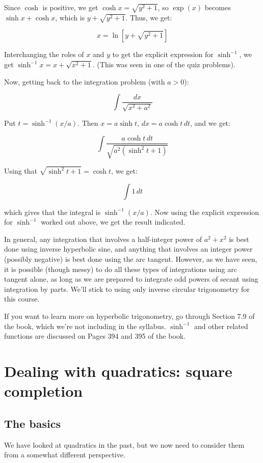 \documentclass[10pt]{amsart}
\begin{document}
Since $\cosh$ is positive, we get $\cosh x = \sqrt{y^2 + 1}$, so
$\exp(x)$ becomes $\sinh x + \cosh x$, which is $y + \sqrt{y^2 + 1}$. Thus, we get:

$$x = \ln[y + \sqrt{y^2 + 1}]$$

Interchanging the roles of $x$ and $y$ to get the explicit expression
for $\sinh^{-1}$, we get $\sinh^{-1} x = x + \sqrt{x^2 + 1}$. (This was
seen in one of the quiz problems).

Now, getting back to the integration problem (with $a > 0$):

$$\int \frac{dx}{\sqrt{x^2 + a^2}}$$

Put $t = \sinh^{-1}(x/a)$. Then $x = a \sinh t$, $dx = a \cosh t \, dt$, and we get:

$$\int \frac{a \cosh t \, dt}{\sqrt{a^2(\sinh^2t + 1)}}$$

Using that $\sqrt{\sinh^2 t + 1} = \cosh t$, we get:

$$\int 1 \, dt$$

which gives that the integral is $\sinh^{-1}(x/a)$. Now using the
explicit expression for $\sinh^{-1}$ worked out above, we get the result
indicated.

In general, any integration that involves a half-integer power of $a^2
+ x^2$ is best done using inverse hyperbolic sine, and anything that
involves an integer power (possibly negative) is best done using the
arc tangent. However, as we have seen, it is possible (though messy)
to do all these types of integrations using arc tangent alone, as long
as we are prepared to integrate odd powers of secant using integration
by parts. We'll stick to using only inverse circular trigonometry for
this course.

If you want to learn more on hyperbolic trigonometry, go through
Section 7.9 of the book, which we're not including in the
syllabus. $\sinh^{-1}$ and other related functions are discussed on
Pages 394 and 395 of the book.

\section{Dealing with quadratics: square completion}

\subsection{The basics}
We have looked at quadratics in the past, but we now need to consider
them from a somewhat different perspective.
\end{document}
